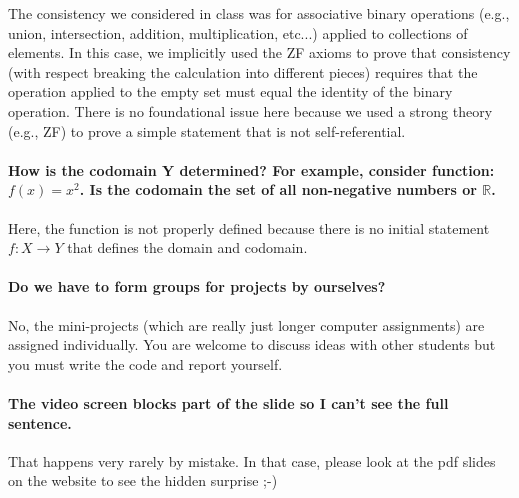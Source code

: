 \documentclass[10pt,english]{article}
\begin{document}
The consistency we considered in class was for associative binary operations (e.g., union, intersection, addition, multiplication, etc...) applied to collections of elements.
In this case, we implicitly used the ZF axioms to prove that consistency (with respect breaking the calculation into different pieces) requires that the operation applied to the empty set must equal the identity of the binary operation.
There is no foundational issue here because we used a strong theory (e.g., ZF) to prove a simple statement that is not self-referential.


\paragraph{How is the codomain Y determined? For example, consider function: $f(x) = x^2$. Is the codomain the set of all non-negative numbers or $\mathbb{R}$.}

Here, the function is not properly defined because there is no initial statement $f\colon X \to Y$ that defines the domain and codomain.

\paragraph{Do we have to form groups for projects by ourselves?}

No, the mini-projects (which are really just longer computer assignments) are assigned individually.
You are welcome to discuss ideas with other students but you must write the code and report yourself.

\paragraph{The video screen blocks part of the slide so I can't see the full sentence.}

That happens very rarely by mistake.  In that case, please look at the pdf slides on the website to see the hidden surprise ;-)
\end{document}
